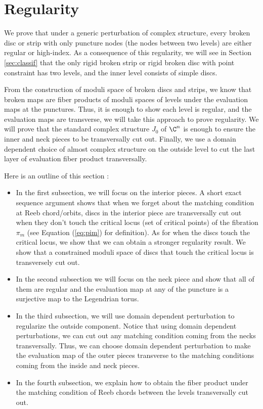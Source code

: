
\section{Regularity} \label{sec:reg}


We prove that under a generic perturbation of complex structure, every broken disc or strip with only puncture nodes (the nodes between two levels) are either regular or high-index. As a consequence of this regularity, we will see in Section \ref{sec:classif} that the only rigid broken strip or rigid broken disc with point constraint has two levels, and the inner level consists of simple discs.


From the construction of moduli space of broken discs and strips, we know that broken maps are fiber products of moduli spaces of levels under the evaluation maps at the punctures. Thus, it is enough to show each level is regular, and the evaluation maps are transverse, we will take this approach to prove regularity. We will prove that the standard complex structure $J_0$ of $\C^n$ is enough to ensure the inner and neck pieces to be transversally cut out. Finally, we use a domain dependent choice of almost complex structure on the outside level to cut the last layer of evaluation fiber product transversally.

\noindent Here is an outline of this section :
\begin{itemize}
    \item In the first subsection, we will focus on the interior pieces. A short exact sequence argument shows that when we forget about the matching condition at Reeb chord/orbits, discs in the interior piece are transversally cut out when they don't touch the critical locus (set of critical points) of the fibration $\pi_m$ (see Equation (\ref{eq:pim}) for definition). As for when the discs touch the critical locus, we show that we can obtain a stronger regularity result. We show that a constrained moduli space of discs that touch the critical locus is transversely cut out.
    \item In the second subsection we will focus on the neck piece and show that all of them are regular and the evaluation map at any of the puncture is a surjective map to the Legendrian torus.
    \item In the third subsection, we will use domain dependent perturbation to regularize the outside component. Notice that using domain dependent perturbations, we can cut out any matching condition coming from the necks transversally. Thus, we can choose domain dependent perturbation to make the evaluation map of the outer pieces transverse to the matching conditions coming from the inside and neck pieces.
    \item In the fourth subsection, we explain how to obtain the fiber product under the matching condition of Reeb chords between the levels transversally cut out.
\end{itemize}

